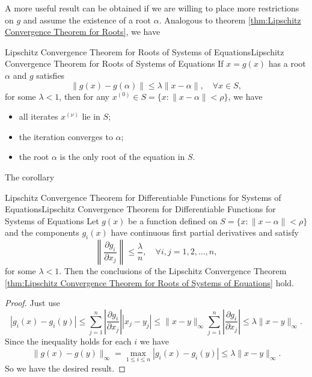 \documentclass[../main.tex]{subfiles}
\begin{document}
A more useful result can be obtained if we are willing to place more restrictions on $g$ and assume the existence of a root $\alpha$. Analogous to theorem \ref{thm:Lipschitz Convergence Theorem for Roots}, we have
\begin{theorem}{Lipschitz Convergence Theorem for Roots of Systems of Equations}{Lipschitz Convergence Theorem for Roots of Systems of Equations}
	If $x = g(x)$ has a root $\alpha$ and $g$ satisfies
	\begin{equation*}
		\| g(x) - g(\alpha) \| \leq \lambda \| x - \alpha \|, \quad \forall x \in S,
	\end{equation*}
	for some $\lambda < 1$, then for any $x^{(0)} \in S = \{ x : \| x - \alpha \| < \rho \}$, we have
	\begin{itemize}
		\item all iterates $x^{(\nu)}$ lie in $S$;
		\item the iteration converges to $\alpha$;
		\item the root $\alpha$ is the only root of the equation in $S$.
	\end{itemize}
\end{theorem}

The corollary
\begin{corollary}{Lipschitz Convergence Theorem for Differentiable Functions for Systems of Equations}{Lipschitz Convergence Theorem for Differentiable Functions for Systems of Equations}
	Let $g(x)$ be a function defined on $S = \{ x : \| x - \alpha \| < \rho \}$ and the components $g_i(x)$ have continuous first partial derivatives and satisfy
	\begin{equation}
		\left\| \frac{\partial g_i}{\partial x_j} \right\| \leq \frac{\lambda}{n}, \quad \forall i, j = 1, 2, \dots, n,
	\end{equation}
	for some $\lambda < 1$. Then the conclusions of the Lipschitz Convergence Theorem \ref{thm:Lipschitz Convergence Theorem for Roots of Systems of Equations} hold.
\end{corollary}
\begin{proof}
	Just use
	\begin{equation*}
		| g_i(x) - g_i(y) | \leq \sum_{j=1}^n \left| \frac{\partial g_i}{\partial x_j} \right| |x_j - y_j| \leq \|x - y\|_\infty \sum_{j=1}^n \left| \frac{\partial g_i}{\partial x_j} \right| \leq \lambda \|x - y\|_\infty.
	\end{equation*}
	Since the inequality holds for each $i$ we have
	\begin{equation}
		\| g(x) - g(y) \|_\infty = \max_{1 \leq i \leq n} | g_i(x) - g_i(y) | \leq \lambda \|x - y\|_\infty.
	\end{equation}
	So we have the desired result.
\end{proof}
\end{document}
